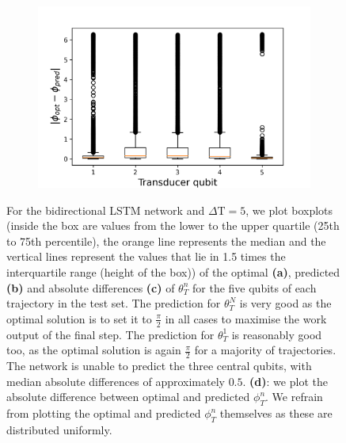\begin{figure}[H]
\begin{subfigure}{0.45\textwidth}
	\end{subfigure}
\begin{subfigure}{0.45\textwidth}
	\centering
	\includegraphics[width=\textwidth]{img/delta_phi_box2}
\end{subfigure}
\caption{For the bidirectional LSTM network and $\Delta \mathrm{T} = 5$, we plot boxplots (inside the box are values from the lower to the upper quartile (25th to 75th percentile), the orange line represents the median and the vertical lines represent the values that lie in 1.5 times the interquartile range (height of the box)) of the optimal \textbf{(a)}, predicted \textbf{(b)} and absolute differences \textbf{(c)} of $\theta^n_T$ for the five qubits of each trajectory in the test set. The prediction for $\theta_T^N$ is very good as the optimal solution is to set it to $\frac{\pi}{2}$ in all cases to maximise the work output of the final step. The prediction for $\theta_T^1$ is reasonably good too, as the optimal solution is again $\frac{\pi}{2}$ for a majority of trajectories. The network is unable to predict the three central qubits, with median absolute differences of approximately $0.5$. \textbf{(d)}: we plot the absolute difference between optimal and predicted $\phi_T^n$. We refrain from plotting the optimal and predicted $\phi_T^n$ themselves as these are distributed uniformly.}
\label{bilstmbox}
\end{figure}

\newpage